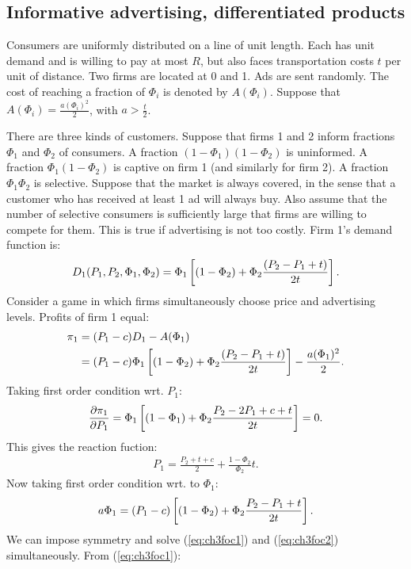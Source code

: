 \subsection{Informative advertising, differentiated products}
Consumers are uniformly distributed on a line of unit length. Each has unit demand and is willing to pay at most $R$, but also faces
transportation costs $t$ per unit of distance. Two firms are located at 0 and 1. Ads are sent randomly. The cost of reaching a fraction
of $\Phi_i$ is denoted by $A(\Phi_i)$. Suppose that $A(\Phi_i)=\frac{a(\Phi_i)^2}{2}$, with $a>\frac{t}{2}$.

There are three kinds of customers. Suppose that firms 1 and 2 inform fractions $\Phi_1$ and $\Phi_2$ of consumers. A fraction
$(1-\Phi_1)(1-\Phi_2)$ is uninformed. A fraction $\Phi_1(1-\Phi_2)$ is captive on firm 1 (and similarly for firm 2). A fraction
$\Phi_1\Phi_2$ is selective. Suppose that the market is always covered, in the sense that a customer who has received at least 1 ad will
always buy. Also assume that the number of selective consumers is sufficiently large that firms are willing to compete for them.
This is true if advertising is not too costly. Firm 1's demand function is:
\begin{align}
	D_1(P_1,P_2,\Phi_1,\Phi_2)=\Phi_1\left[(1-\Phi_2)+\Phi_2\frac{(P_2-P_1+t)}{2t}\right].
\end{align}
Consider a game in which firms simultaneously choose price and advertising levels. Profits of firm 1 equal:
\begin{align}
	\pi_1 & =(P_1-c)D_1-A(\Phi_1)                                                              \\
	      & =(P_1-c)\Phi_1\left[(1-\Phi_2)+\Phi_2\frac{(P_2-P_1+t)}{2t}\right]-\frac{a(\Phi_1)^2}{2}.
\end{align}
Taking first order condition wrt. $P_1$:
\begin{align}
	\frac{\partial \pi_1}{\partial P_1}=\Phi_1\left[(1-\Phi_1)+\Phi_2\frac{P_2-2P_1+c+t}{2t}\right]=0.
\end{align}
This gives the reaction fuction:
\begin{align}
	P_1=\frac{P_2+t+c}{2}+\frac{1-\Phi_2}{\Phi_2}t.
	\label{eq:ch3foc1}
\end{align}
Now taking first order condition wrt. to $\Phi_1$:
\begin{align}
	a\Phi_1=(P_1-c)\left[(1-\Phi_2)+\Phi_2\frac{P_2-P_1+t}{2t}\right].
	\label{eq:ch3foc2}
\end{align}
We can impose symmetry and solve (\ref{eq:ch3foc1}) and (\ref{eq:ch3foc2}) simultaneously. From (\ref{eq:ch3foc1}):
